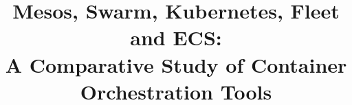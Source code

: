 \documentclass[conference]{IEEEtran}
\begin{document}
\title{Mesos, Swarm, Kubernetes, Fleet and ECS: \\
A Comparative Study of Container Orchestration Tools}
 \author{
}


\maketitle




\IEEEpeerreviewmaketitle





























\end{document}
